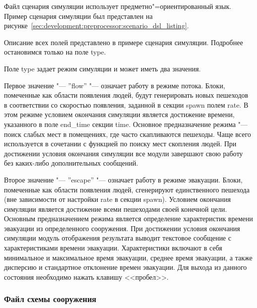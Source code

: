 Файл сценария симуляции использует предметно"=ориентированный язык.
Пример сценария симуляции был представлен на рисунке~\ref{sec:development:preprocessor:scenario_dsl_listing}.
%

Описание всех полей представлено в примере сценария симуляции. Подробнее остановимся только на поле type.

Поле type задает режим симуляции и может иметь два значения.

Первое значение "--- ''flow'' "--- означает работу в режиме потока.
Блоки, помеченные как области появления людей, будут генерировать новых пешеходов в соответствии со скоростью появления,
заданной в секции spawn полем rate.
В этом режиме условием окончания симуляции является достижение времени, указанного в поле end\_time секции time.
Основное предназначение режима "--- поиск слабых мест в помещениях, где часто скапливаются пешеходы.
Чаще всего используется в сочетании с функцией по поиску мест скопления людей.
При достижении условия окончания симуляции все модули завершают свою работу без каких-либо дополнительных сообщений.

Второе значение "--- ''escape'' "--- означает работу в режиме эвакуации.
Блоки, помеченные как области появления людей, сгенерируют единственного пешехода (вне зависимости от настройки rate в секции spawn).
Условием окончания симуляции является достижение всеми пешеходами своей конечной цели.
Основным предназначением режима является определение характеристик времени эвакуации из определенного сооружения.
При достижении условия окончания симуляции модуль отображения результата выводит текстовое сообщение с
характеристиками времени эвакуации. Характеристики включают в себя минимальное и максимальное время эвакуации,
среднее время эвакуации, а также дисперсию и стандартное отклонение времен эвакуации.
Для выхода из данного состояния необходимо нажать клавишу <<пробел>>.


\subsubsection{Файл схемы сооружения}
\label{sec:manual:input:building_scheme}

